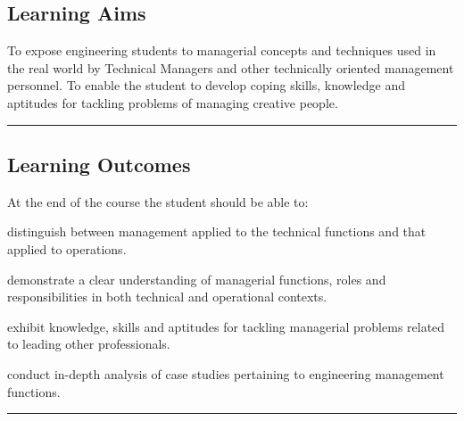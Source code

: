 \subsection*{Learning Aims}
To expose engineering students to managerial concepts and techniques used in the real world by Technical Managers and other technically oriented management personnel.
To enable the student to develop coping skills, knowledge and aptitudes for tackling problems of managing creative people.
\vspace{2ex}\hrule\vspace{2ex}

\subsection*{Learning Outcomes}
At the end of the course the student should be able to:
\begin{outline}
    \1 distinguish between management applied to the technical functions and that applied to operations.

    \1 demonstrate a clear understanding of managerial functions, roles and responsibilities in both technical and operational contexts.

    \1 exhibit knowledge, skills and aptitudes for tackling managerial problems related to leading other professionals.

    \1 conduct in-depth analysis of case studies pertaining to engineering management functions.

\end{outline}
\vspace{2ex}\hrule\vspace{2ex}


